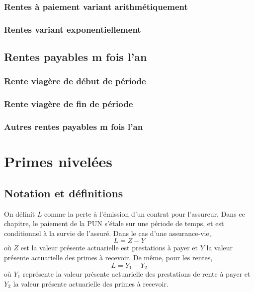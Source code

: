 \documentclass[10pt, french]{article}
\begin{document}
\begin{multicols*}{3}
\subsubsection*{\textcolor{amber(sae/ece)}{Rentes à paiement variant arithmétiquement}}


\subsubsection*{\textcolor{amber(sae/ece)}{Rentes variant exponentiellement}}

\subsection*{Rentes payables m fois l'an}

\subsubsection*{\textcolor{amber(sae/ece)}{Rente viagère de début de période}}

\subsubsection*{\textcolor{amber(sae/ece)}{Rente viagère de fin de période}}

\subsubsection*{\textcolor{amber(sae/ece)}{Autres rentes payables m fois l'an}}


\section{Primes nivelées}
\subsection{Notation et définitions}
On définit $L$ comme la perte à l'émission d'un contrat pour l'assureur. Dans ce chapitre, le paiement de la PUN s'étale sur une période de temps, et est conditionnel  à la survie de l'assuré. Dans le cas d'une assurance-vie,
\[L = Z - Y\]
où $Z$ est la valeur présente actuarielle est prestations à payer et $Y$ la valeur présente actuarielle des primes à recevoir. De même, pour les rentes,
\[L = Y_1 - Y_2\]
où $Y_1$ représente la valeur présente actuarielle des prestations de rente à payer et $Y_2$ la valeur présente actuarielle des primes à recevoir. \\


\end{multicols*}
\end{document}
